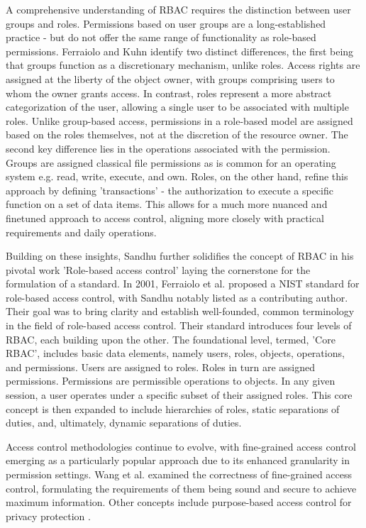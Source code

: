 A comprehensive understanding of \ac{RBAC} requires the distinction between user groups and roles. Permissions based on user groups are a long-established practice - but do not offer the same range of functionality as role-based permissions. Ferraiolo and Kuhn \cite{ferraiolo1992role} identify two distinct differences, the first being that groups function as a discretionary mechanism, unlike roles. Access rights are assigned at the liberty of the object owner, with groups comprising users to whom the owner grants access. In contrast, roles represent a more abstract categorization of the user, allowing a single user to be associated with multiple roles. Unlike group-based access, permissions in a role-based model are assigned based on the roles themselves, not at the discretion of the resource owner. The second key difference lies in the operations associated with the permission. Groups are assigned classical file permissions as is common for an operating system e.g. read, write, execute, and own. Roles, on the other hand, refine this approach by defining 'transactions' - the authorization to execute a specific function on a set of data items. This allows for a much more nuanced and finetuned approach to access control, aligning more closely with practical requirements and daily operations. \par
Building on these insights, Sandhu further solidifies the concept of \ac{RBAC} in his pivotal work 'Role-based access control' \cite{sandhu1998role} laying the cornerstone for the formulation of a standard. In 2001, Ferraiolo et al. \cite{Ferraiolo2001} proposed a NIST standard for role-based access control, with Sandhu notably listed as a contributing author. Their goal was to bring clarity and establish well-founded, common terminology in the field of role-based access control. Their standard introduces four levels of \ac{RBAC}, each building upon the other. The foundational level, termed, 'Core \ac{RBAC}', includes basic data elements, namely users, roles, objects, operations, and permissions. Users are assigned to roles. Roles in turn are assigned permissions. Permissions are permissible operations to objects. In any given session, a user operates under a specific subset of their assigned roles. This core concept is then expanded to include hierarchies of roles, static separations of duties, and, ultimately, dynamic separations of duties. \par
Access control methodologies continue to evolve, with fine-grained access control emerging as a particularly popular approach due to its enhanced granularity in permission settings. Wang et al. \cite{wang2007correctness} examined the correctness of fine-grained access control, formulating the requirements of them being sound and secure to achieve maximum information. Other concepts include purpose-based access control for privacy protection \cite{Byun2008}. \par
